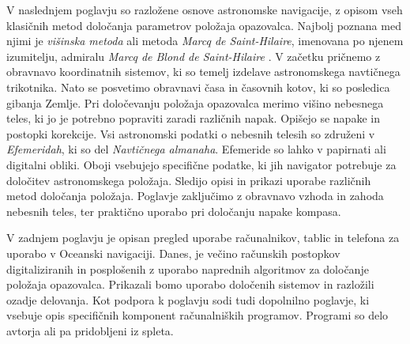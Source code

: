 V naslednjem poglavju so razložene osnove astronomske navigacije, z opisom vseh klasičnih metod določanja parametrov položaja opazovalca. Najbolj poznana med njimi je \emph{višinska metoda} ali metoda \emph{Marcq de Saint-Hilaire}, imenovana po njenem izumitelju, admiralu  \emph{Marcq de Blond de Saint-Hilaire} \cite{duval1966admiral}. V začetku pričnemo z obravnavo koordinatnih sistemov, ki so temelj izdelave astronomskega navtičnega trikotnika. Nato se posvetimo obravnavi časa in časovnih kotov, ki so posledica gibanja Zemlje. Pri določevanju položaja opazovalca merimo višino nebesnega teles, ki jo je potrebno popraviti zaradi različnih napak. Opišejo se napake in postopki korekcije. Vsi astronomski podatki o nebesnih telesih so združeni v \emph{Efemeridah}, ki so del \emph{Navtičnega almanaha}. Efemeride so lahko v papirnati ali digitalni obliki. Oboji vsebujejo specifične podatke, ki jih navigator potrebuje za določitev astronomskega položaja. Sledijo opisi in prikazi uporabe različnih metod določanja položaja. Poglavje zaključimo z obravnavo vzhoda in zahoda nebesnih teles, ter praktično uporabo pri določanju napake kompasa.

V zadnjem poglavju je opisan pregled uporabe računalnikov, tablic in telefona za uporabo v Oceanski navigaciji. Danes, je večino računskih postopkov digitaliziranih in posplošenih z uporabo naprednih algoritmov za določanje položaja opazovalca. Prikazali bomo uporabo določenih sistemov in razložili ozadje delovanja. Kot podpora k poglavju sodi tudi dopolnilno poglavje, ki vsebuje opis specifičnih komponent računalniških programov. Programi so delo avtorja ali pa pridobljeni iz spleta.  
